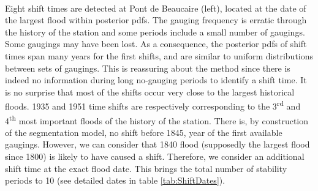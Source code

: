 \documentclass[11pt]{article}
\begin{document}
    \paragraph{}
    Eight shift times are detected at Pont de Beaucaire (left), located at the date of the largest flood within posterior pdfs. The gauging frequency is erratic through the history of the station and some periods include a small number of gaugings. Some gaugings may have been lost. As a consequence, the posterior pdfs of shift times span many years for the first shifts, and are similar to uniform distributions between sets of gaugings. This is reassuring about the method since there is indeed no information during long no-gauging periods to identify a shift time. It is no surprise that most of the shifts occur very close to the largest historical floods. 1935 and 1951 time shifts are respectively corresponding to the 3\textsuperscript{rd} and 4\textsuperscript{th} most important floods of the history of the station. There is, by construction of the segmentation model, no shift before 1845, year of the first available gaugings. However, we can consider that 1840 flood (supposedly the largest flood since 1800) is likely to have caused a shift. Therefore, we consider an additional shift time at the exact flood date. This brings the total number of stability periods to 10 (see detailed dates in table \ref{tab:ShiftDates}). 
    
\end{document}
